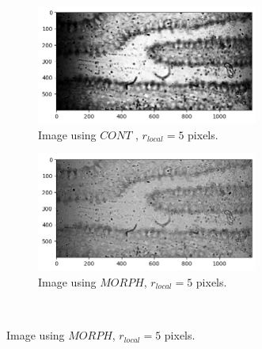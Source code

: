 \begin{figure}[h!]
    \begin{subfigure}[b]{0.5\textwidth}
        \centering
        \includegraphics[width=0.8\textwidth]{afbeeldingen/rank/img_cont.png}
        \caption{Image using $CONT$ , $r_{local}=5$ pixels.}
        \label{fig_rank_cont}
    \end{subfigure}
    \begin{subfigure}[b]{0.5\textwidth}
        \centering
        \includegraphics[width=0.8\textwidth]{afbeeldingen/rank/img_morph.png}
        \caption{Image using $MORPH$, $r_{local}=5$ pixels.}
        \label{fig_rank_morph}
    \end{subfigure}
\\


\end{figure}
